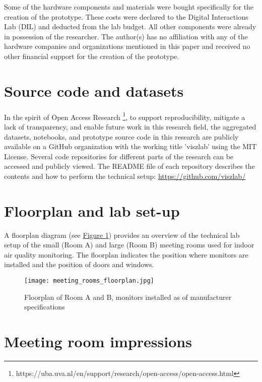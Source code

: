 \begin{appendices}
Some of the hardware components and materials were bought specifically for the creation of the prototype. These costs were declared to the Digital Interactions Lab (DIL) and deducted from the lab budget. All other components were already in possession of the researcher. The author(s) has no affiliation with any of the hardware companies and organizations mentioned in this paper and received no other financial support for the creation of the prototype.

\section{Source code and datasets}
\label{appendix:source}

In the spirit of Open Access Research \footnote{https://uba.uva.nl/en/support/research/open-access/open-access.html}, to support reproducibility, mitigate a lack of transparency, and enable future work in this research field, the aggregated datasets, notebooks, and prototype source code in this research are publicly available on a GitHub organization with the working title 'viszlab' using the MIT License. Several code repositories for different parts of the research can be accessed and publicly viewed. The README file of each repository describes the contents and how to perform the technical setup: \underline{https://github.com/viszlab/}

\pagebreak

\section{Floorplan and lab set-up}
\label{appendix:floorplan}

A floorplan diagram (see \hyperref[fig:floorplan]{Figure \ref{fig:floorplan}}) provides an overview of the technical lab setup of the small (Room A) and large (Room B) meeting rooms used for indoor air quality monitoring. The floorplan indicates the position where monitors are installed and the position of doors and windows.

\begin{figure}[H]
    \centering
    \texttt{[image: meeting\_rooms\_floorplan.jpg]}
    \caption{Floorplan of Room A and B, monitors installed as of manufacturer specifications}
    \label{fig:floorplan}
\end{figure}

\section{Meeting room impressions}
\label{appendix:meetings}


\end{appendices}
